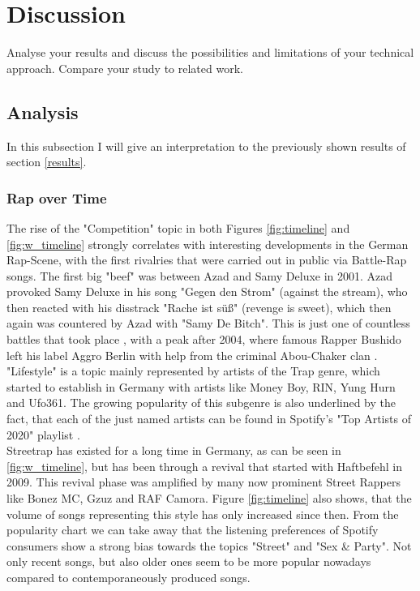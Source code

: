 \documentclass[conference]{IEEEtran}
\begin{document}
\section{Discussion}
Analyse your results and discuss the possibilities and limitations of
your technical approach. Compare your study to related work.
\subsection{Analysis}
In this subsection I will give an interpretation to the previously shown results of section \ref{results}.
\subsubsection{Rap over Time}
The rise of the "Competition" topic in both Figures \ref{fig:timeline} and \ref{fig:w_timeline} strongly correlates with interesting developments in the German Rap-Scene, with the first rivalries that were carried out in public via Battle-Rap songs. The first big "beef" was between Azad and Samy Deluxe in 2001. Azad provoked Samy Deluxe in his song "Gegen den Strom" (against the stream), who then reacted with his disstrack "Rache ist süß" (revenge is sweet), which then again was countered by Azad with "Samy De Bitch". This is just one of countless battles that took place \cite{battles}, with a peak after 2004, where famous Rapper Bushido left his label Aggro Berlin with help from the criminal Abou-Chaker clan \cite{abou-chaker}.\\
"Lifestyle" is a topic mainly represented by artists of the Trap genre, which started to establish in Germany with artists like Money Boy, RIN, Yung Hurn and Ufo361. The growing popularity of this subgenre is also underlined by the fact, that each of the just named artists can be found in Spotify's "Top Artists of 2020" playlist \cite{spotify_2020}.\\
Streetrap has existed for a long time in Germany, as can be seen in \ref{fig:w_timeline}, but has been through a revival that started with Haftbefehl in 2009. This revival phase was amplified by many now prominent Street Rappers like Bonez MC, Gzuz and RAF Camora\cite{strassenrap}. Figure \ref{fig:timeline} also shows, that the volume of songs representing this style has only increased since then. From the popularity chart we can take away that the listening preferences of Spotify consumers show a strong bias towards the topics "Street" and "Sex \& Party". Not only recent songs, but also older ones seem to be more popular nowadays compared to contemporaneously produced songs.
\end{document}
